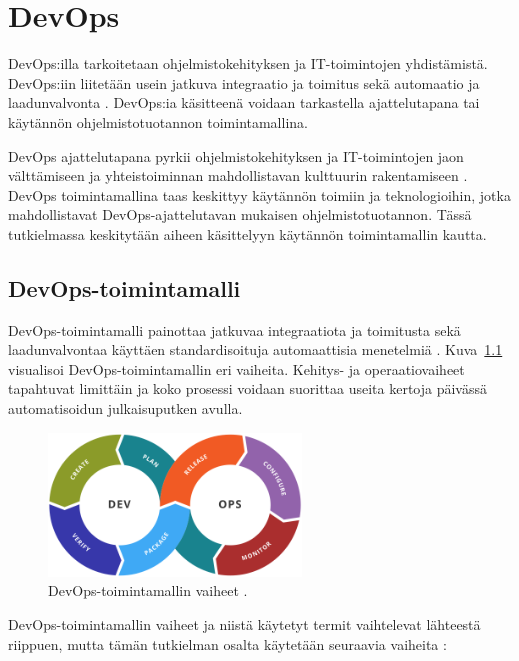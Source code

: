 \chapter{DevOps\label{devops}}

DevOps:illa tarkoitetaan ohjelmistokehityksen ja IT-toimintojen yhdistämistä.
DevOps:iin liitetään usein jatkuva integraatio ja toimitus sekä automaatio ja laadunvalvonta \cite{Jabbari16, Leite19}.
DevOps:ia käsitteenä voidaan tarkastella ajattelutapana tai käytännön ohjelmistotuotannon toimintamallina.

DevOps ajattelutapana pyrkii ohjelmistokehityksen ja IT-toimintojen jaon välttämiseen ja yhteistoiminnan mahdollistavan kulttuurin rakentamiseen \cite{Klein21}.
DevOps toimintamallina taas keskittyy käytännön toimiin ja teknologioihin, jotka mahdollistavat DevOps-ajattelutavan mukaisen ohjelmistotuotannon.
Tässä tutkielmassa keskitytään aiheen käsittelyyn käytännön toimintamallin kautta.

\section{DevOps-toimintamalli}

DevOps-toimintamalli painottaa jatkuvaa integraatiota ja toimitusta sekä laadunvalvontaa käyttäen standardisoituja automaattisia menetelmiä \cite{Leite19}.
Kuva~\ref{fig:devops} visualisoi DevOps-toimintamallin eri vaiheita.
Kehitys- ja operaatiovaiheet tapahtuvat limittäin ja koko prosessi voidaan suorittaa useita kertoja päivässä automatisoidun julkaisuputken avulla.

\begin{figure}[ht]
\begin{center}
\includegraphics[width=0.6\textwidth]{figures/devops_toolchain.png}
\caption{DevOps-toimintamallin vaiheet \cite{Wikimedia23}\label{fig:devops}.}
\end{center}
\end{figure}

DevOps-toimintamallin vaiheet ja niistä käytetyt termit vaihtelevat lähteestä riippuen, mutta tämän tutkielman osalta käytetään seuraavia vaiheita \cite{Alnafessah21}:

